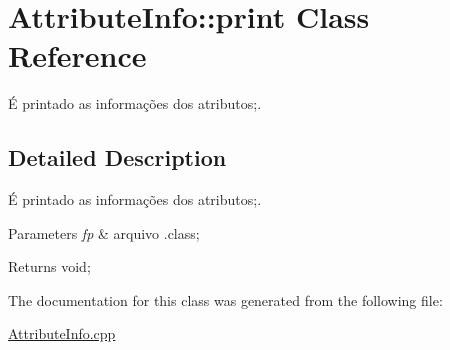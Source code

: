 \hypertarget{class_attribute_info_1_1print}{}\section{Attribute\+Info\+:\+:print Class Reference}
\label{class_attribute_info_1_1print}


É printado as informações dos atributos;.  




\subsection{Detailed Description}
É printado as informações dos atributos;. 


\begin{DoxyParams}{Parameters}
{\em fp} & arquivo .class; \\
\hline
\end{DoxyParams}
\begin{DoxyReturn}{Returns}
void; 
\end{DoxyReturn}


The documentation for this class was generated from the following file\+:\begin{DoxyCompactItemize}
\item 
\hyperlink{_attribute_info_8cpp}{Attribute\+Info.\+cpp}\end{DoxyCompactItemize}
